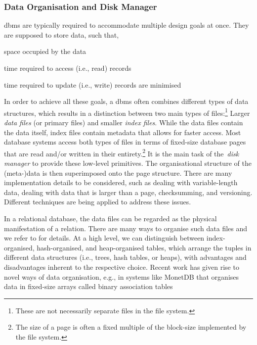 \subsubsection{Data Organisation and Disk Manager}
\acrshort{dbms} are typically required to accommodate multiple design goals at once. They are supposed to store data, such that,
\begin{enumerate*}[label=(\roman*),itemjoin={{, }}, itemjoin*={{, and, }}, after={{.}}]
    \item space occupied by the data
    \item time required to access (i.e., read) records
    \item time required to update (i.e., write) records are minimised
\end{enumerate*}
In order to achieve all these goals, a \acrshort{dbms} often combines different types of data structures, which results in a distinction between two main types of files:\footnote{These are not necessarily separate files in the file system.} Larger \emph{data files} (or primary files) and smaller \emph{index files}. While the data files contain the data itself, index files contain metadata that allows for faster access. Most database systems access both types of files in terms of fixed-size database pages that are read and/or written in their entirety.\footnote{The size of a page is often a fixed multiple of the block-size implemented by the file system.} It is the main task of the \emph{disk manager} to provide these low-level primitives. The organisational structure of the (meta-)data is then superimposed onto the page structure. There are many implementation details to be considered, such as dealing with variable-length data, dealing with data that is larger than a page, checksumming, and versioning. Different techniques are being applied to address these issues.

In a relational database, the data files can be regarded as the physical manifestation of a relation. There are many ways to organise such data files and we refer to \cite{Petrov:2019Database} for details. At a high level, we can distinguish between index-organised, hash-organised, and heap-organised tables, which arrange the tuples in different data structures (i.e., trees, hash tables, or heaps), with advantages and disadvantages inherent to the respective choice. Recent work has given rise to novel ways of data organisation, e.g., in systems like MonetDB that organises data in fixed-size arrays called binary association tables \cite{Boncz:2008Breaking}

